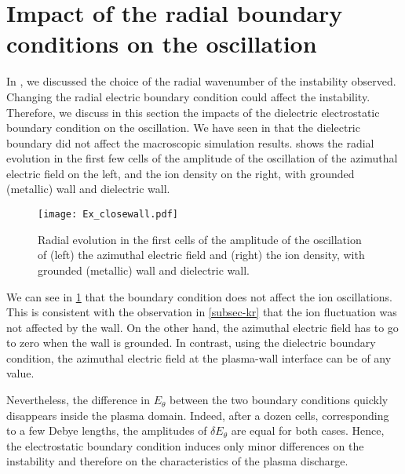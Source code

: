 
\section{Impact of the radial boundary conditions on the oscillation}
  \label{subsec-BC}

  In , we discussed the choice of the radial wavenumber of the instability observed.
  Changing the radial electric boundary condition could affect the instability.
  Therefore, we discuss in this section  the impacts of the dielectric electrostatic boundary condition on the oscillation.
  We have seen in  that the dielectric boundary did not affect the macroscopic simulation results.
   shows the radial evolution in the first few cells of the amplitude of the oscillation of the azimuthal electric field on the left, and the ion density on the right, with grounded (metallic) wall and dielectric wall.
  
  \begin{figure}[!hbt]
    \centering
    \texttt{[image: Ex\_closewall.pdf]}
    \caption{Radial evolution in the first cells of the amplitude of the oscillation of (left) the azimuthal electric field and (right) the ion density, with grounded (metallic) wall and dielectric wall.}
    \label{fig-closswallosci}
  \end{figure}
  
  We can see in \cref{fig-closswallosci} that the boundary condition does not affect the ion oscillations.
  This is consistent with the observation in \cref{subsec-kr} that the ion fluctuation was not affected by the wall.
  On the other hand, the azimuthal electric field has to go to zero when the wall is grounded.
  In contrast, using the dielectric boundary condition, the azimuthal electric field at the plasma-wall interface can be of any value.
  
  Nevertheless, the difference in $E_{\theta}$ between the two boundary conditions quickly disappears inside the plasma domain.
  Indeed, after a dozen cells, corresponding to a few Debye lengths, the amplitudes of $\delta E_{\theta}$ are equal for both cases.
  Hence, the electrostatic boundary condition induces only minor differences on the instability and therefore on the characteristics of  the plasma discharge.
  
  